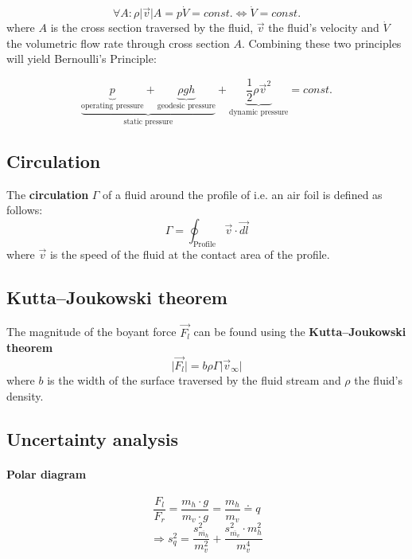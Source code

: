 \documentclass{scrreprt}
\begin{document}
\begin{equation}
\forall A : \rho \lvert \vec{v}\rvert A = p \dot{V} = const. \Longleftrightarrow \dot{V} = const.
\end{equation}
where $A$ is the cross section traversed by the fluid, $\vec{v}$ the fluid's velocity and $\dot{V}$ the volumetric flow rate through cross section $A$. Combining these two principles will yield Bernoulli's Principle:

\begin{equation}
\underbrace{\underbrace{p}_{\text{operating pressure}} + \underbrace{\rho g h}_{\text{geodesic pressure}}}_{\text{static pressure}} + \underbrace{\frac{1}{2} \rho \vec{v}^2}_{\text{dynamic pressure}} = const.
\end{equation}

\subsection{Circulation}
The \textbf{circulation} $\Gamma$ of a fluid around the profile of i.e. an air foil is defined as follows:
\begin{equation}
\Gamma = \oint_{\text{Profile}}\vec{v}\cdot\vec{dl}
\end{equation}
where $\vec{v}$ is the speed of the fluid at the contact area of the profile.

\subsection{Kutta–Joukowski theorem}
The magnitude of the boyant force $\vec{F_l}$ can be found using the \textbf{Kutta–Joukowski theorem} 
\begin{equation}
\lvert \vec{F_l}\rvert = b \rho \Gamma \lvert \vec{v}_\infty \rvert
\end{equation}
where $b$ is the width of the surface traversed by the fluid stream and $\rho$ the fluid's density.

\subsection{Uncertainty analysis}
\paragraph*{Polar diagram}
\begin{equation}
\frac{F_l}{F_r} = \frac{m_h\cdot g}{m_v\cdot g} = \frac{m_h}{m_v} \doteq q
\end{equation}
\begin{equation}
\Longrightarrow s_q^2 = \frac{s_{\overline{m_h}}^2}{m_v^2} + \frac{s_{\overline{m_v}}^2 \cdot m_h^2}{m_v^4}
\end{equation}
\end{document}
